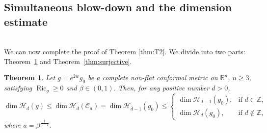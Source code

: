 \documentclass[12pt]{amsart}
\theoremstyle{plain}
\newtheorem{theorem}{Theorem}[section]
\theoremstyle{definition}
\theoremstyle{remark}     %
\numberwithin{equation}{section}
\begin{document}
\subsection{Simultaneous blow-down and the dimension estimate}
\ \\
We can now complete the proof of Theorem \ref{thm:T2}. We divide into two parts: Theorem~\ref{thm:injective} and Theorem~\ref{thm:surjective}.


\begin{theorem}
\label{thm:injective}
Let $g=e^{2w}g_0$ be a complete non-flat conformal metric on
$\mathbb R^n$, $n\geq3$, satisfying $\operatorname{Ric}_g\geq0$ and
$\beta\in (0,1)$.  Then, for any positive number $d>0$,
\begin{equation}\label{eq:dimension-drop-final}
    \dim\mathcal H_d(g)
    \leq \dim\mathcal H_{d}(\mathcal{C}_a)
    =\dim \mathcal{H}_{\bar{d}-1}(g_0)\leq 
    \begin{cases}
        \dim\mathcal H_{d-1}(g_0), &\text{if }
        d\in\mathbb{Z},\\
        \dim\mathcal H_d(g_0),
        &\text{if }
        d\not\in\mathbb{Z},
    \end{cases}
\end{equation}
where $a=\beta^{\frac{1}{n-1}}$.
\end{theorem}
\end{document}
